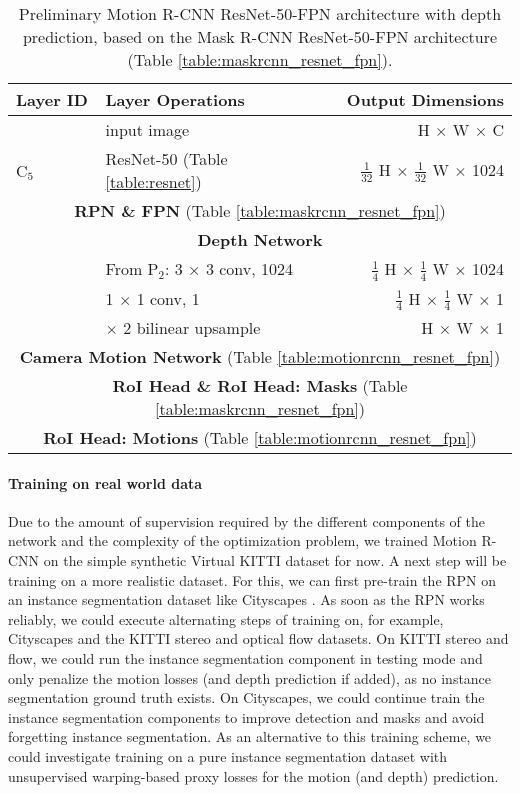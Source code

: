 {
\begin{table}[h]
\centering
\begin{tabular}{llr}
\toprule
\textbf{Layer ID} & \textbf{Layer Operations} & \textbf{Output Dimensions} \\
\midrule\midrule
& input image & H $\times$ W $\times$ C \\
\midrule
C$_5$ & ResNet-50 (Table \ref{table:resnet}) & $\tfrac{1}{32}$ H $\times$ $\tfrac{1}{32}$ W $\times$ 1024 \\
\midrule
\multicolumn{3}{c}{\textbf{RPN \& FPN} (Table \ref{table:maskrcnn_resnet_fpn})} \\
\midrule
\multicolumn{3}{c}{\textbf{Depth Network}}\\
\midrule
& From P$_2$: 3 $\times$ 3 conv, 1024 & $\tfrac{1}{4}$ H $\times$ $\tfrac{1}{4}$ W $\times$ 1024 \\
& 1 $\times$ 1 conv, 1 & $\tfrac{1}{4}$ H $\times$ $\tfrac{1}{4}$ W $\times$ 1 \\
& $\times$ 2 bilinear upsample & H $\times$ W $\times$ 1 \\
\midrule
\multicolumn{3}{c}{\textbf{Camera Motion Network} (Table \ref{table:motionrcnn_resnet_fpn})}\\
\midrule
\multicolumn{3}{c}{\textbf{RoI Head \& RoI Head: Masks} (Table \ref{table:maskrcnn_resnet_fpn})} \\
\midrule
\multicolumn{3}{c}{\textbf{RoI Head: Motions} (Table \ref{table:motionrcnn_resnet_fpn})}\\
\bottomrule
\end{tabular}

\caption {
Preliminary Motion R-CNN ResNet-50-FPN architecture with depth prediction,
based on the Mask R-CNN ResNet-50-FPN architecture (Table \ref{table:maskrcnn_resnet_fpn}).
}
\label{table:motionrcnn_resnet_fpn_depth}
\end{table}
}
\paragraph{Training on real world data}
Due to the amount of supervision required by the different components of the network
and the complexity of the optimization problem,
we trained Motion R-CNN on the simple synthetic Virtual KITTI dataset for now.
A next step will be training on a more realistic dataset.
For this, we can first pre-train the RPN on an instance segmentation dataset like
Cityscapes \cite{Cityscapes}. As soon as the RPN works reliably, we could execute alternating
steps of training on, for example, Cityscapes and the KITTI stereo and optical flow datasets.
On KITTI stereo and flow, we could run the instance segmentation component in testing mode and only penalize
the motion losses (and depth prediction if added), as no instance segmentation ground truth exists.
On Cityscapes, we could continue train the instance segmentation components to
improve detection and masks and avoid forgetting instance segmentation.
As an alternative to this training scheme, we could investigate training on a pure
instance segmentation dataset with unsupervised warping-based proxy losses for the motion (and depth) prediction.

